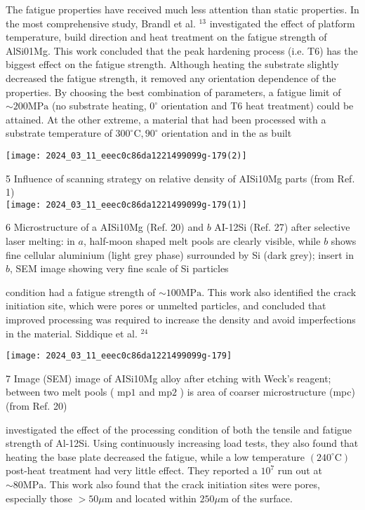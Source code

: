 \documentclass[10pt]{article}
\begin{document}
The fatigue properties have received much less attention than static properties. In the most comprehensive study, Brandl et al. ${ }^{13}$ investigated the effect of platform temperature, build direction and heat treatment on the fatigue strength of AlSi01Mg. This work concluded that the peak hardening process (i.e. T6) has the biggest effect on the fatigue strength. Although heating the substrate slightly decreased the fatigue strength, it removed any orientation dependence of the properties. By choosing the best combination of parameters, a fatigue limit of $\sim 200 \mathrm{MPa}$ (no substrate heating, $0^{\circ}$ orientation and T6 heat treatment) could be attained. At the other extreme, a material that had been processed with a substrate temperature of $300^{\circ} \mathrm{C}, 90^{\circ}$ orientation and in the as built

\begin{center}
\texttt{[image: 2024\_03\_11\_eeec0c86da1221499099g-179(2)]}
\end{center}

5 Influence of scanning strategy on relative density of AISi10Mg parts (from Ref. 1)\\
\texttt{[image: 2024\_03\_11\_eeec0c86da1221499099g-179(1)]}

6 Microstructure of a AISi10Mg (Ref. 20) and $b$ AI-12Si (Ref. 27) after selective laser melting: in $a$, half-moon shaped melt pools are clearly visible, while $b$ shows fine cellular aluminium (light grey phase) surrounded by Si (dark grey); insert in $b$, SEM image showing very fine scale of Si particles

condition had a fatigue strength of $\sim 100 \mathrm{MPa}$. This work also identified the crack initiation site, which were pores or unmelted particles, and concluded that improved processing was required to increase the density and avoid imperfections in the material. Siddique et al. ${ }^{24}$

\begin{center}
\texttt{[image: 2024\_03\_11\_eeec0c86da1221499099g-179]}
\end{center}

7 Image (SEM) image of AISi10Mg alloy after etching with Weck's reagent; between two melt pools ( $\mathrm{mp} 1$ and $\mathrm{mp2}$ ) is area of coarser microstructure (mpc) (from Ref. 20)

investigated the effect of the processing condition of both the tensile and fatigue strength of Al-12Si. Using continuously increasing load tests, they also found that heating the base plate decreased the fatigue, while a low temperature $\left(240^{\circ} \mathrm{C}\right)$ post-heat treatment had very little effect. They reported a $10^{7}$ run out at $\sim 80 \mathrm{MPa}$. This work also found that the crack initiation sites were pores, especially those $>50 \mu \mathrm{m}$ and located within $250 \mu \mathrm{m}$ of the surface.
\end{document}
